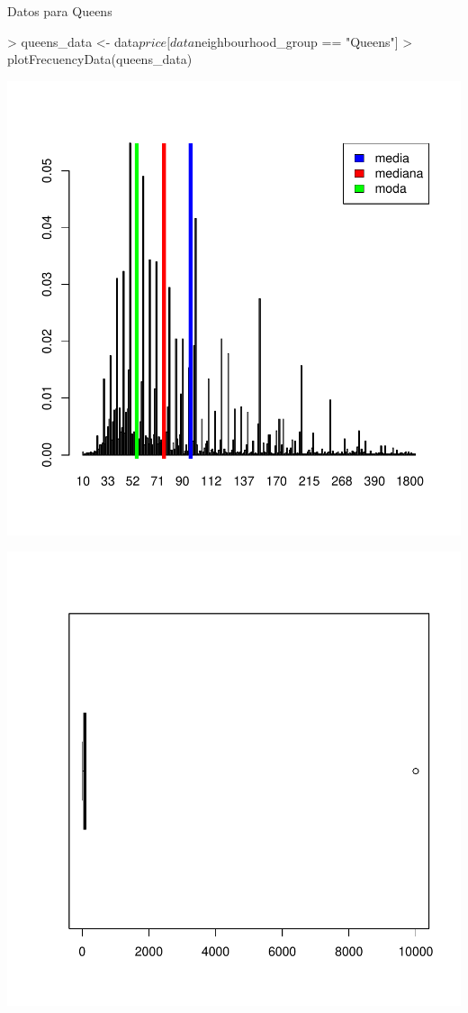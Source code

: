 \documentclass [a4paper] {article}
\begin{document}
Datos para Queens
\begin{center}
\begin{Schunk}
\begin{Sinput}
> queens_data <- data$price[data$neighbourhood_group == "Queens"]
> plotFrecuencyData(queens_data)
\end{Sinput}
\end{Schunk}
\includegraphics{entrega-030}
\end{center}
\begin{center}
\includegraphics{entrega-031}
\end{center}
\end{document}
